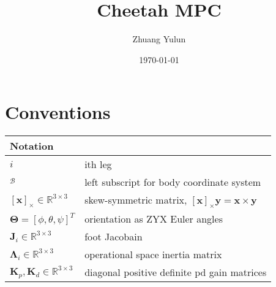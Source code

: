 \documentclass{article}
\title{Cheetah MPC}
\author{Zhuang Yulun}
\date{\today}
\begin{document}
\maketitle

\section{Conventions}


\begin{tabular}{l l}
    \hline
    Notation & \\
    \hline
    $ i$ & ith leg\\
    $_\mathcal B$ &left subscript for body coordinate system\\
    $[\mathbf x]_\times \in \mathbb R^{3\times 3}$ & skew-symmetric matrix, $[\mathbf x]_\times \mathbf y = \mathbf x \times \mathbf y$\\
    $\mathbf \Theta = [\phi, \theta, \psi]^T$ & orientation as ZYX Euler angles\\
    $\mathbf J_i\in \mathbb R^{3\times 3}$ & foot Jacobain\\
    $\mathbf\Lambda_i\in \mathbb R^{3\times 3}$ &operational space inertia matrix\\
    $\mathbf K_p, \mathbf K_d\in \mathbb R^{3\times 3}$ &diagonal positive definite pd gain matrices\\
    \hline

\end{tabular}
\end{document}
